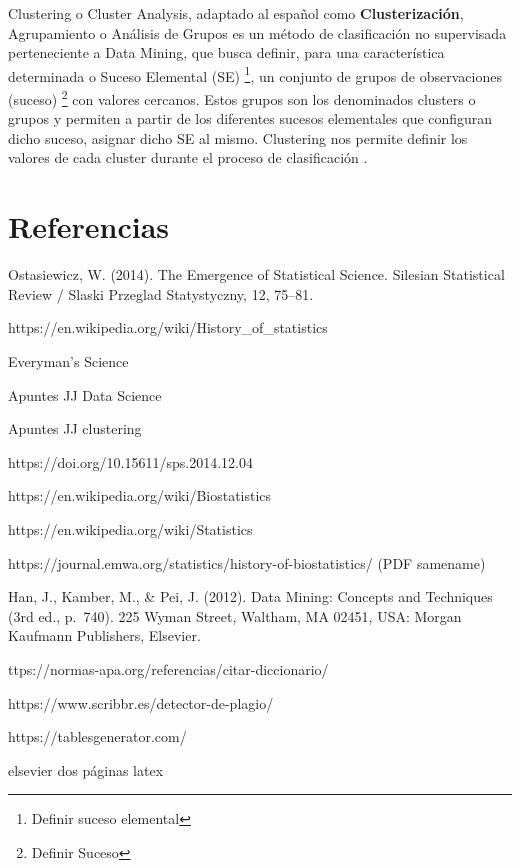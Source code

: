 \documentclass[3p,twocolumn]{elsarticle}
\begin{document}
Clustering o Cluster Analysis, adaptado al español como \textbf{Clusterización}, Agrupamiento o Análisis de Grupos es un método de clasificación no supervisada perteneciente a Data Mining, que busca definir, para una característica determinada o Suceso Elemental (SE) \footnote{Definir suceso elemental}, un conjunto de grupos de observaciones (suceso) \footnote{Definir Suceso} con valores cercanos. Estos grupos son los denominados clusters o grupos y permiten a partir de los diferentes sucesos elementales que configuran dicho suceso, asignar dicho SE al mismo. Clustering nos permite definir los valores de cada cluster durante el proceso de clasificación \cite{cita5}.









 

\newpage

\section{Referencias}
\renewcommand{\section}[2]{}%
\begin{thebibliography}{X}

 Ostasiewicz, W. (2014). The Emergence of Statistical Science.
Silesian Statistical Review / Slaski Przeglad Statystyczny, 12, 75--81.

 https://en.wikipedia.org/wiki/History\_of\_statistics

 Everyman's Science

 Apuntes JJ Data Science

 Apuntes JJ clustering

https://doi.org/10.15611/sps.2014.12.04

https://en.wikipedia.org/wiki/Biostatistics

https://en.wikipedia.org/wiki/Statistics

https://journal.emwa.org/statistics/history-of-biostatistics/ (PDF samename)

Han, J., Kamber, M., \& Pei, J. (2012). Data Mining: Concepts and
Techniques (3rd ed., p.~740). 225 Wyman Street, Waltham, MA 02451, USA:
Morgan Kaufmann Publishers, Elsevier.

\end{thebibliography}

\section{Ayuda}

https://normas-apa.org/referencias/citar-diccionario/

https://www.scribbr.es/detector-de-plagio/

https://tablesgenerator.com/

elsevier dos páginas latex
\end{document}
